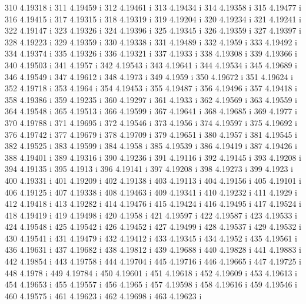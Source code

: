  310  4.19318  i
 311  4.19459  i
 312  4.19461  i
 313  4.19434  i
 314  4.19358  i
 315  4.19477  i
 316  4.19415  i
 317  4.19315  i
 318  4.19319  i
 319  4.19204  i
 320  4.19234  i
 321  4.19241  i
 322  4.19147  i
 323  4.19326  i
 324  4.19396  i
 325  4.19345  i
 326  4.19359  i
 327  4.19397  i
 328  4.19223  i
 329  4.19359  i
 330  4.19338  i
 331  4.19489  i
 332  4.1959  i
 333  4.19492  i
 334  4.19374  i
 335  4.19326  i
 336  4.19321  i
 337  4.1933  i
 338  4.19308  i
 339  4.19366  i
 340  4.19503  i
 341  4.1957  i
 342  4.19543  i
 343  4.19641  i
 344  4.19534  i
 345  4.19689  i
 346  4.19549  i
 347  4.19612  i
 348  4.1973  i
 349  4.1959  i
 350  4.19672  i
 351  4.19624  i
 352  4.19718  i
 353  4.1964  i
 354  4.19453  i
 355  4.19487  i
 356  4.19496  i
 357  4.19418  i
 358  4.19386  i
 359  4.19235  i
 360  4.19297  i
 361  4.1933  i
 362  4.19569  i
 363  4.19559  i
 364  4.19548  i
 365  4.19513  i
 366  4.19599  i
 367  4.19641  i
 368  4.19685  i
 369  4.1977  i
 370  4.19788  i
 371  4.19695  i
 372  4.19546  i
 373  4.1956  i
 374  4.19597  i
 375  4.19692  i
 376  4.19742  i
 377  4.19679  i
 378  4.19709  i
 379  4.19651  i
 380  4.1957  i
 381  4.19545  i
 382  4.19525  i
 383  4.19599  i
 384  4.1958  i
 385  4.19539  i
 386  4.19419  i
 387  4.19426  i
 388  4.19401  i
 389  4.19316  i
 390  4.19236  i
 391  4.19116  i
 392  4.19145  i
 393  4.19208  i
 394  4.19135  i
 395  4.1913  i
 396  4.19141  i
 397  4.19208  i
 398  4.19273  i
 399  4.1923  i
 400  4.19331  i
 401  4.19209  i
 402  4.19138  i
 403  4.19113  i
 404  4.19156  i
 405  4.19101  i
 406  4.19125  i
 407  4.19338  i
 408  4.19463  i
 409  4.19341  i
 410  4.19232  i
 411  4.1929  i
 412  4.19418  i
 413  4.19282  i
 414  4.19476  i
 415  4.19424  i
 416  4.19495  i
 417  4.19524  i
 418  4.19419  i
 419  4.19498  i
 420  4.1958  i
 421  4.19597  i
 422  4.19587  i
 423  4.19533  i
 424  4.19548  i
 425  4.19542  i
 426  4.19452  i
 427  4.19499  i
 428  4.19537  i
 429  4.19532  i
 430  4.19541  i
 431  4.19479  i
 432  4.19412  i
 433  4.19345  i
 434  4.1952  i
 435  4.19561  i
 436  4.19631  i
 437  4.19682  i
 438  4.19812  i
 439  4.19688  i
 440  4.19828  i
 441  4.19883  i
 442  4.19854  i
 443  4.19758  i
 444  4.19704  i
 445  4.19716  i
 446  4.19665  i
 447  4.19725  i
 448  4.1978  i
 449  4.19784  i
 450  4.19601  i
 451  4.19618  i
 452  4.19609  i
 453  4.19613  i
 454  4.19653  i
 455  4.19557  i
 456  4.1965  i
 457  4.19598  i
 458  4.19616  i
 459  4.19546  i
 460  4.19575  i
 461  4.19623  i
 462  4.19698  i
 463  4.19623  i
